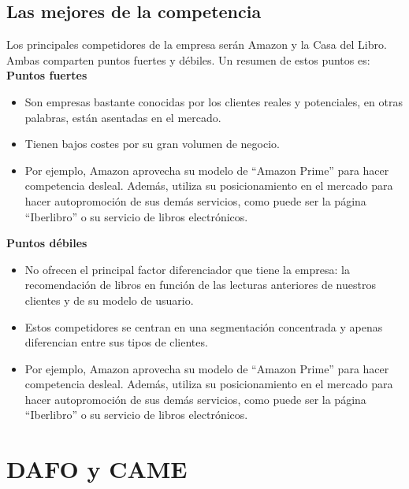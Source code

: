 \documentclass[openany,overnay,a4paper, twoside, 12pt]{book}
\begin{document}
\subsection{Las mejores de la competencia}
Los principales competidores de la empresa serán Amazon y la Casa del Libro. Ambas comparten puntos fuertes y débiles. Un resumen de estos puntos es:
\textbf{Puntos fuertes} %
\begin{itemize}
\item Son empresas bastante conocidas por los clientes reales y potenciales, en otras palabras, están asentadas en el mercado.
\item Tienen bajos costes por su gran volumen de negocio.
\item Por ejemplo, Amazon aprovecha su modelo de “Amazon Prime” para hacer competencia desleal. Además, utiliza su posicionamiento en el mercado para hacer autopromoción de sus demás servicios, como puede ser la página “Iberlibro” o su servicio de libros electrónicos.
\end{itemize}
\textbf{Puntos débiles} %
\begin{itemize}
\item No ofrecen el principal factor diferenciador que tiene la empresa: la recomendación de libros en función de las lecturas anteriores de nuestros clientes y de su modelo de usuario.
\item Estos competidores se centran en una segmentación concentrada y apenas diferencian entre sus tipos de clientes.
\item Por ejemplo, Amazon aprovecha su modelo de “Amazon Prime” para hacer competencia desleal. Además, utiliza su posicionamiento en el mercado para hacer autopromoción de sus demás servicios, como puede ser la página “Iberlibro” o su servicio de libros electrónicos.
\end{itemize}
\newpage
\section{DAFO y CAME} 
\end{document}
